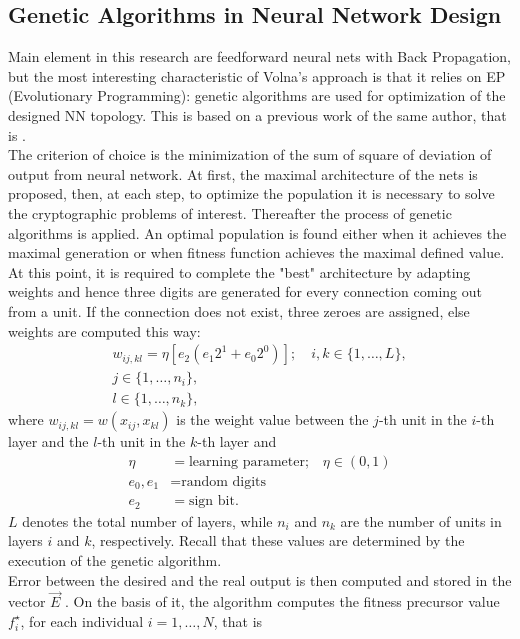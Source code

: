 \documentclass[%
    corpo=11pt,
    twoside,
    stile=classica,
    oldstyle,
    autoretitolo,
    tipotesi=magistrale,
    greek,
    evenboxes,
    english
]{toptesi}
\begin{document}
\subsection{Genetic Algorithms in Neural Network Design}
Main element in this research are feedforward neural nets with Back Propagation, but the most interesting characteristic of Volna's approach is that it relies on EP (Evolutionary Programming): genetic algorithms are used for optimization of the designed NN topology. This is based on a previous work of the same author, that is \cite{volna2}. \\
The criterion of choice is the minimization of the sum of square of deviation of output from neural network. At first, the maximal architecture of the nets is proposed, then, at each step, to optimize the population it is necessary to solve the cryptographic problems of interest. Thereafter the process of genetic algorithms is applied. An optimal population is found either when it achieves the maximal generation or when fitness function achieves the maximal defined value. \\
At this point, it is required to complete the "best" architecture by adapting weights and hence three digits are generated for every
connection coming out from a unit. If the connection does not exist, three zeroes are assigned, else weights are computed this way:
\begin{align}
w_{ij,kl} = \eta[e_2(e_1 2^1 + e_0 2^0)]; \quad i,k\in\{1,\dots,L\}, \\
  j\in\{1,\dots, n_i\}, \nonumber \\
  l \in\{1, \dots, n_k\}, \nonumber 
\end{align}
where $w_{ij,kl} = w(x_{ij}, x_{kl})$ is the weight value between the $j$-th unit in the $i$-th layer and the $l$-th unit in the $k$-th layer and
\begin{align*}
    \eta &= \text{learning parameter;} \quad \eta \in (0,1)\\
    e_0, e_1 &= \text{random digits} \\
  	e_2 &= \text{sign bit}.
\end{align*}
$L$ denotes the total number of layers, while $n_i$ and $n_k$ are the number of units in layers $i$ and $k$, respectively. Recall that these values are determined by the execution of the genetic algorithm. \\
Error between the desired and the real output is then computed and stored in the vector $\vec{E}$ . On the basis of it, the algorithm computes the fitness precursor value $f_i^{\star}$, for each individual $i = 1, \dots, N$, that is
\end{document}
